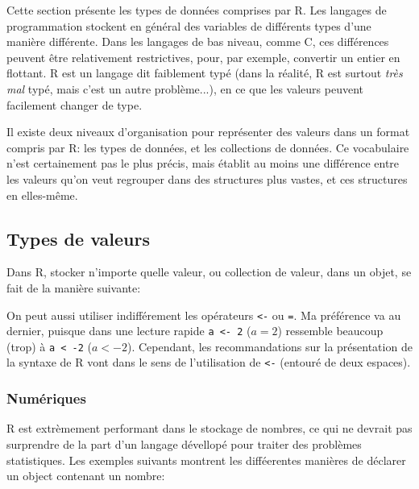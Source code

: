 Cette section présente les types de données comprises par R.
Les langages de programmation stockent en général des variables de différents types d'une manière différente.
Dans les langages de bas niveau, comme C, ces différences peuvent être relativement restrictives, pour, par exemple, convertir un entier en flottant.
R est un langage dit faiblement typé (dans la réalité, R est surtout \emph{très mal} typé, mais c'est un autre problème...), en ce que les valeurs peuvent facilement changer de type.


Il existe deux niveaux d'organisation pour représenter des valeurs dans un format compris par R: les types de données, et les collections de données.
Ce vocabulaire n'est certainement pas le plus précis, mais établit au moins une différence entre les valeurs qu'on veut regrouper dans des structures plus vastes, et ces structures en elles-même.

\subsection{Types de valeurs}

Dans R, stocker n'importe quelle valeur, ou collection de valeur, dans un objet, se fait de la manière suivante:

\begin{knitrout}
\color{fgcolor}\begin{kframe}
\begin{flushleft}
\ttfamily\noindent
{}\hlassignement{\usebox{\hlnormalsizeboxlessthan}-}{\ }\mbox{}
\normalfont
\end{flushleft}
\end{kframe}
\end{knitrout}


On peut aussi utiliser indifférement les opérateurs \texttt{<-} ou \texttt{=}.
Ma préférence va au dernier, puisque dans une lecture rapide \texttt{a <- 2} ($a = 2$) ressemble beaucoup (trop) à \texttt{a < -2} ($a < -2$).
Cependant, les recommandations sur la présentation de la syntaxe de R vont dans le sens de l'utilisation de \texttt{<-} (entouré de deux espaces). 

\subsubsection{Numériques}

R est extrèmement performant dans le stockage de nombres, ce qui ne devrait pas surprendre de la part d'un langage dévellopé pour traiter des problèmes statistiques.
Les exemples suivants montrent les difféerentes manières de déclarer un object contenant un nombre:

